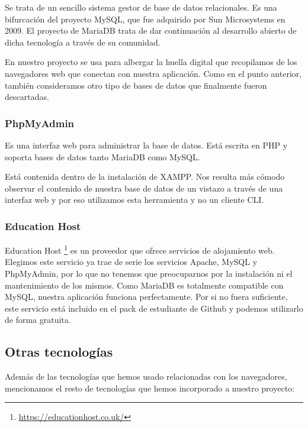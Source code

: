 Se trata de un sencillo sistema gestor de base de datos relacionales. Es una bifurcación del proyecto MySQL, que fue adquirido por Sun Microsystems en 2009. El proyecto de MariaDB trata de dar continuación al desarrollo abierto de dicha tecnología a través de su comunidad. \par 

En nuestro proyecto se usa para albergar la huella digital que recopilamos de los navegadores web que conectan con nuestra aplicación. Como en el punto anterior, también consideramos otro tipo de bases de datos que finalmente fueron descartadas. \par 

\subsubsection{PhpMyAdmin}

Es una interfaz web para administrar la base de datos. Está escrita en PHP y soporta bases de datos tanto MariaDB como MySQL. \par 

Está contenida dentro de la instalación de XAMPP. Nos resulta más cómodo observar el contenido de nuestra base de datos de un vistazo a través de una interfaz web y por eso utilizamos esta herramienta y no un cliente CLI. \par 

\subsubsection{Education Host}

Education Host \footnote{\url{https://educationhost.co.uk/}} es un proveedor que ofrece servicios de alojamiento web. Elegimos este servicio ya trae de serie los servicios Apache, MySQL y PhpMyAdmin, por lo que no tenemos que preocuparnos por la instalación ni el mantenimiento de los mismos. Como MariaDB es totalmente compatible con MySQL, nuestra aplicación funciona perfectamente. Por si no fuera suficiente, este servicio está incluido en el pack de estudiante de Github y podemos utilizarlo de forma gratuita.

\subsection{Otras tecnologías}

Además de las tecnologías que hemos usado relacionadas con los navegadores, mencionamos el resto de tecnologías que hemos incorporado a nuestro proyecto: \par 


